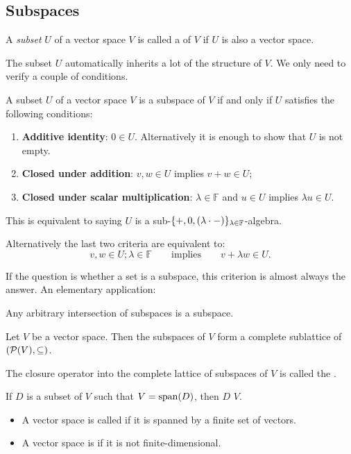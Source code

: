 \subsection{Subspaces}
\begin{definition}
A \textit{subset} $U$ of a vector space $V$ is called a  of $V$ if $U$ is also a vector space.
\end{definition}
The subset $U$ automatically inherits a lot of the structure of $V$. We only need to verify a couple of conditions.
\begin{proposition} \label{subspaceCriterion}
A subset $U$ of a vector space $V$ is a subspace of $V$ \textup{if and only if} $U$ satisfies the following conditions:
\begin{enumerate}
\item \textbf{Additive identity}: $0 \in U$. Alternatively it is enough to show that $U$ is not empty.
\item \textbf{Closed under addition}: $v,w \in U$ implies $v+w\in U$;
\item \textbf{Closed under scalar multiplication}: $\lambda \in \mathbb{F}$ and $u\in U$ implies $\lambda u \in U$.
\end{enumerate}
This is equivalent to saying $U$ is a sub-$\{+,0, (\lambda\cdot -)\}_{\lambda\in\mathbb{F}}$-algebra.
\end{proposition}
Alternatively the last two criteria are equivalent to:
\[ v,w\in U; \lambda \in \mathbb{F} \qquad \text{implies} \qquad v+\lambda w \in U. \]

If the question is whether a set is a subspace, this criterion is almost always the answer. An elementary application:
\begin{proposition}
Any arbitrary intersection of subspaces is a subspace.
\end{proposition}
\begin{corollary}
Let $V$ be a vector space. Then the subspaces of $V$ form a complete sublattice of $\sSet{\powerset(V),\subseteq}$.
\end{corollary}

\begin{definition}
The closure operator into the complete lattice of subspaces of $V$ is called the .

If $D$ is a subset of $V$ such that $V = \operatorname{span}(D)$, then $D$  $V$.

\begin{itemize}
\item A vector space is called  if it is spanned by a finite set of vectors.
\item A vector space is  if it is not finite-dimensional.
\end{itemize}
\end{definition}


